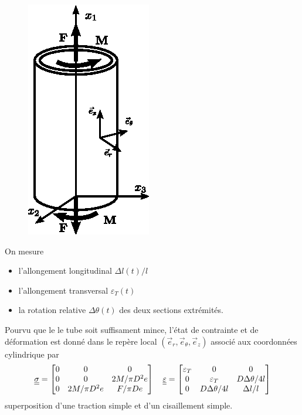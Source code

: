 \begin{figure}
    \begin{center}
        \includegraphics{../images/T1_Ch04-0008}
    \end{center}
\end{figure}
On mesure
\begin{itemize}
    \item l'allongement longitudinal $\Delta l(t)/l$
    \item l'allongement transversal $\varepsilon_T(t)$
    \item la rotation relative $\Delta \theta(t)$ des deux sections extrémités.
\end{itemize}
Pourvu que le le tube soit suffisament mince, l'état de contrainte et de déformation est donné dans le repère local $\left(\vec{e}_r, \vec{e}_{\theta}, \vec{e}_z  \right)$ associé aux coordonnées cylindrique par
\begin{equation}
    \underline{\underline{\sigma}} =
    \begin{bmatrix}
        0 & 0 & 0 \\
        0 & 0 & 2M/\pi D^2 e \\
        0 & 2M/\pi D^2 e & F/\pi D e
    \end{bmatrix}
    \quad
    \underline{\underline{\varepsilon}} = 
    \begin{bmatrix}
        \varepsilon_T & 0 & 0 \\
        0 & \varepsilon_T & D \Delta \theta / 4 l \\
        0 & D \Delta \theta / 4 l & \Delta l/l
    \end{bmatrix}
    \label{eq:Ch04-036}
\end{equation}
superposition d'une traction simple et d'un cisaillement simple.

